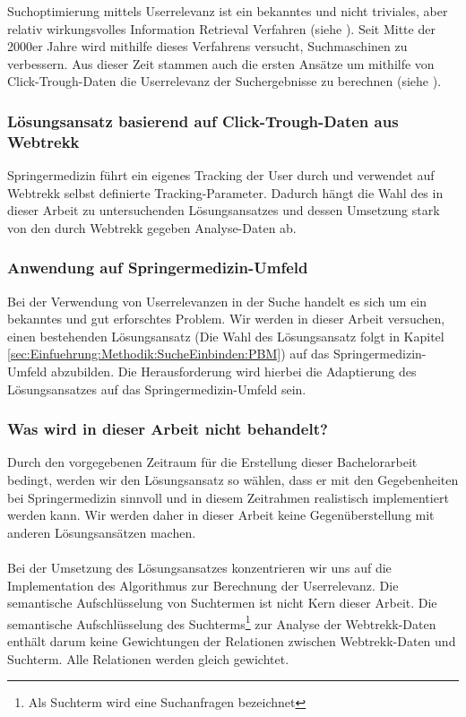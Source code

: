 Suchoptimierung mittels Userrelevanz ist ein bekanntes und nicht triviales, aber relativ wirkungsvolles Information Retrieval Verfahren (siehe \cite{IWUSBI}). Seit Mitte der 2000er Jahre wird mithilfe dieses Verfahrens versucht, Suchmaschinen zu verbessern. Aus dieser Zeit stammen auch die ersten Ansätze um mithilfe von Click-Trough-Daten die Userrelevanz der Suchergebnisse zu berechnen (siehe \cite{Joachims}).

\subsubsection{Lösungsansatz basierend auf Click-Trough-Daten aus Webtrekk}
\label{sec:Einfuehrung:ZielArbeit:AbbildungSpringermedizinUmfeld:Loesungsansatz}

Springermedizin führt ein eigenes Tracking der User durch und verwendet auf Webtrekk selbst definierte Tracking-Parameter. Dadurch hängt die Wahl des in dieser Arbeit zu untersuchenden Lösungsansatzes und dessen Umsetzung stark von den durch Webtrekk gegeben Analyse-Daten ab.

\subsubsection{Anwendung auf Springermedizin-Umfeld}
\label{sec:Einfuehrung:ZielArbeit:AbbildungSpringermedizinUmfeld:Adaptierung}

Bei der Verwendung von Userrelevanzen in der Suche handelt es sich um ein bekanntes und gut erforschtes Problem. Wir werden in dieser Arbeit versuchen, einen bestehenden Lösungsansatz (Die Wahl des Lösungsansatz folgt in Kapitel \ref{sec:Einfuehrung:Methodik:SucheEinbinden:PBM}) auf das Springermedizin-Umfeld abzubilden. Die Herausforderung wird hierbei die Adaptierung des Lösungsansatzes auf das Springermedizin-Umfeld sein.

\subsubsection{Was wird in dieser Arbeit nicht behandelt?}
\label{sec:Einfuehrung:ZielArbeit:AbbildungSpringermedizinUmfeld:NichtBehandeln}

Durch den vorgegebenen Zeitraum für die Erstellung dieser Bachelorarbeit bedingt, werden wir den Lösungsansatz so wählen, dass er mit den Gegebenheiten bei Springermedizin sinnvoll und in diesem Zeitrahmen realistisch implementiert werden kann. Wir werden daher in dieser Arbeit keine Gegenüberstellung mit anderen Lösungsansätzen machen. 
\\
\\
Bei der Umsetzung des Lösungsansatzes konzentrieren wir uns auf die Implementation des Algorithmus zur Berechnung der Userrelevanz. Die semantische Aufschlüsselung von Suchtermen ist nicht Kern dieser Arbeit. Die semantische Aufschlüsselung des Suchterms\footnote{Als Suchterm wird eine Suchanfragen bezeichnet} zur Analyse der Webtrekk-Daten enthält darum keine Gewichtungen der Relationen zwischen Webtrekk-Daten und Suchterm. Alle Relationen werden gleich gewichtet. 

